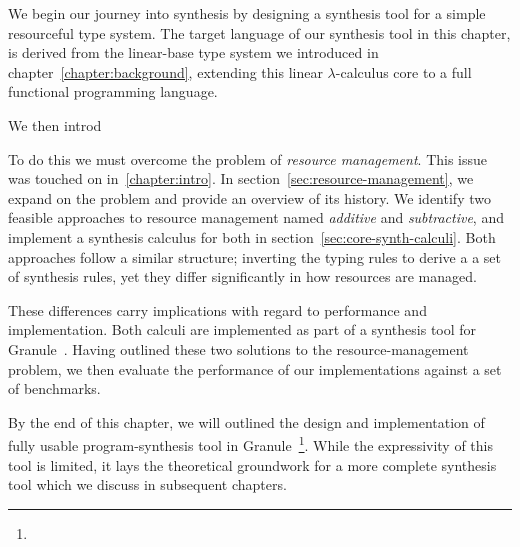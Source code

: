 We begin our journey into synthesis by designing a synthesis tool for a simple
resourceful type system. The target language of our synthesis tool in this chapter, 
is derived from the linear-base type system we introduced in chapter~\ref{chapter:background}, 
extending this linear $\lambda$-calculus core to a full functional 
programming language.

We then introd

To do this we must overcome the problem of \textit{resource management}. This
issue was touched on in~\ref{chapter:intro}. In
section~\ref{sec:resource-management}, we expand on the problem and provide an
overview of its history. We identify two feasible approaches to resource
management named \textit{additive} and \textit{subtractive}, and implement a
synthesis calculus for both in section~\ref{sec:core-synth-calculi}. Both
approaches follow a similar structure; inverting the typing rules to derive a
a set of synthesis rules, yet they differ significantly in how resources are
managed.

These differences carry implications with regard to performance and
implementation. Both calculi are implemented as part of a synthesis tool for Granule~\cite{}. 
Having outlined these two solutions to the resource-management problem, we then
evaluate the performance of our implementations against a set of benchmarks.

By the end of this chapter, we will outlined the design and implementation of 
fully usable program-synthesis tool in Granule~\footnote{}. While the expressivity of this 
tool is limited, it lays the theoretical groundwork for a more complete synthesis tool which 
we discuss in subsequent chapters. 
